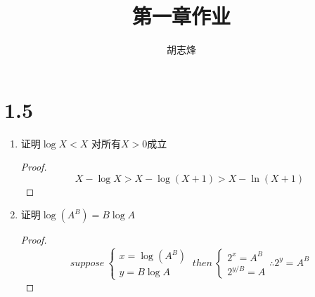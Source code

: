 \documentclass[utf8]{ctexart}
\author{胡志烽}
\title{第一章作业}
\begin{document}
\maketitle

\section*{1.5}
\begin{enumerate}
\item 证明$\log X <X$ 对所有$X>0$成立
\begin{proof}
\[
X - \log X > X- \log(X+1)>X-\ln(X+1)
\]
\end{proof}
\item 证明$\log (A^B) = B\log A$
\begin{proof}
\[
suppose\ \begin{cases}
x = \log (A^B)\\ y = B\log A
\end{cases}
\ then\ \begin{cases}
2^x = A^B\\ 2^{y/B} = A
\end{cases}
\therefore 2^y = A^B 
\]
\end{proof}
\end{enumerate}
\end{document}
